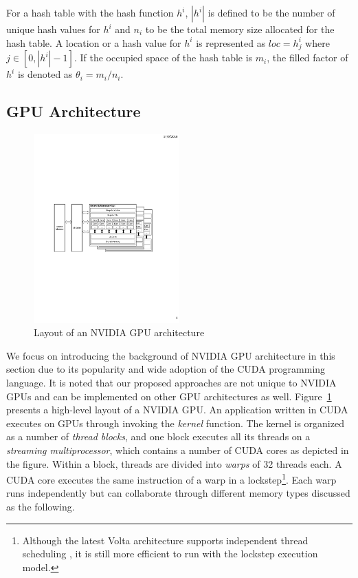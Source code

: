 For a hash table with the hash function $h^i$, $|h^i|$ is defined to be the number of unique hash values for $h^i$ and $n_i$ to be the total memory size allocated for the hash table.
A location or a hash value for $h^i$ is represented as $loc = h^i_j$ where $j \in [0,|h^i|-1]$.
If the occupied space of the hash table is $m_i$, the filled factor of $h^i$ is denoted as $\theta_i = m_i / n_i$.

\subsection{GPU Architecture}

\begin{figure}[t]
	\centering
	\includegraphics[width=0.5\textwidth]{fig/GPU-arch.pdf}
	\caption{Layout of an NVIDIA GPU architecture}
	\label{fig:arch}
\end{figure}

We focus on introducing the background of NVIDIA GPU architecture in this section due to its popularity and wide adoption of the CUDA programming language. 
It is noted that our proposed approaches are not unique to NVIDIA GPUs and can be implemented on other GPU architectures as well. Figure~\ref{fig:arch} presents a high-level layout of a NVIDIA GPU. An application written in CUDA executes on GPUs through invoking the \emph{kernel} function. The kernel is organized as a number of \emph{thread blocks}, and one block executes all its threads on a \emph{streaming multiprocessor}, which contains a number of CUDA cores as depicted in the figure. Within a block, threads are divided into \emph{warps} of 32 threads each. 
A CUDA core executes the same instruction of a warp in a lockstep\footnote{Although the latest Volta architecture supports independent thread scheduling \cite{},
	it is still more efficient to run with the lockstep execution model.}.
Each warp runs independently but can collaborate through different memory types discussed as the following.  

